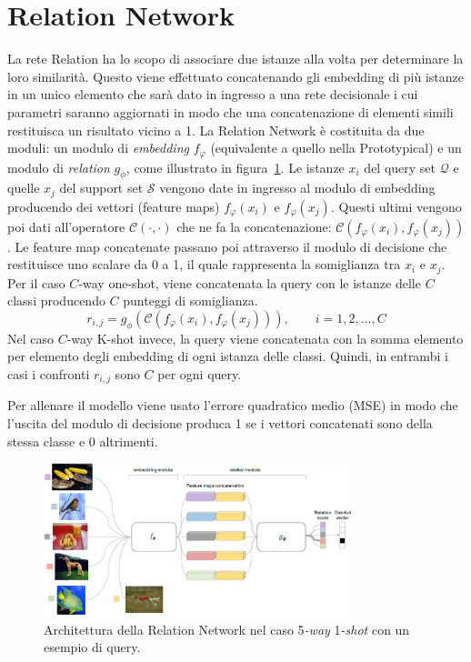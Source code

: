 \documentclass[12pt,a4paper,titlepage]{article}
\begin{document}
\section{Relation Network}
La rete Relation ha lo scopo di associare due istanze alla volta per determinare la loro similarità.
Questo viene effettuato concatenando gli embedding di più istanze in un unico elemento che sarà dato in ingresso a una rete decisionale i cui parametri saranno aggiornati in modo che una concatenazione di elementi simili restituisca un risultato vicino a 1.
La Relation Network è costituita da due moduli: un modulo di \emph{embedding} $f_\varphi$ (equivalente a quello nella Prototypical) e un modulo di \emph{relation} $g_\phi$, come illustrato in figura~\ref{fig:relation_network}.
Le istanze $x_i$ del query set $\mathcal{Q}$ e quelle $x_j$ del support set $\mathcal{S}$ vengono date in ingresso al modulo di embedding producendo dei vettori (feature maps) $f_\varphi(x_i)$ e $f_\varphi(x_j)$.
Questi ultimi vengono poi dati all'operatore $\mathcal{C}(\cdot ,\cdot)$ che ne fa la concatenazione: $\mathcal{C}(f_\varphi(x_i),f_\varphi(x_j))$.
Le feature map concatenate passano poi attraverso il modulo di decisione che restituisce uno scalare da 0 a 1, il quale rappresenta la somiglianza tra $x_i$ e $x_j$.
Per il caso $C$-way one-shot, viene concatenata la query con le istanze delle $C$ classi producendo $C$ punteggi di somiglianza.
\begin{equation}
	r_{i,j}=g_\phi(\mathcal{C}(f_\varphi(x_i),f_\varphi(x_j))),  \qquad i = 1, 2, \dots, C
\end{equation}
Nel caso $C$-way K-shot invece, la query viene concatenata con la somma elemento per elemento degli embedding di ogni istanza delle classi. Quindi, in entrambi i casi i confronti $r_{i,j}$ sono $C$ per ogni query.

Per allenare il modello viene usato l'errore quadratico medio (MSE) in modo che l'uscita del modulo di decisione produca 1 se i vettori concatenati sono della stessa classe e 0 altrimenti.

\begin{figure}[h]
	\centering	
	\includegraphics[width=0.8\textwidth]{Immagini/relation_network}
	\caption{Architettura della Relation Network nel caso 5\emph{-way} 1\emph{-shot} con un esempio di query.~\cite{DBLP:journals/corr/abs-1711-06025}}
	\label{fig:relation_network}
\end{figure}
\end{document}
